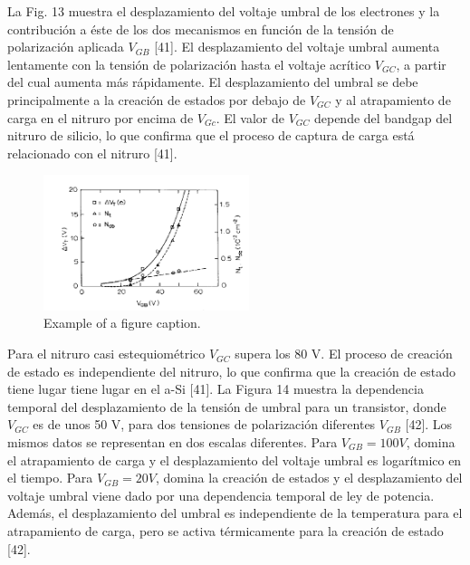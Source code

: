 \documentclass[conference]{IEEEtran}
\begin{document}
    La Fig. 13 muestra el desplazamiento del voltaje umbral de los electrones y la contribución a 
    éste de los dos mecanismos en función de la tensión de polarización aplicada $V_{GB}$ [41]. 
    El desplazamiento del voltaje umbral aumenta lentamente con la tensión de polarización hasta 
    el voltaje acrítico $V_{GC}$, a partir del cual aumenta más rápidamente. El desplazamiento del 
    umbral se debe principalmente a la creación de estados por debajo de $V_{GC}$ y al atrapamiento 
    de carga en el nitruro por encima de $V_{Gc}$. El valor de $V_{GC}$ depende del bandgap del 
    nitruro de silicio, lo que confirma que el proceso de captura de carga está relacionado con 
    el nitruro [41]. 

\begin{figure}[htbp]
    \centerline{\includegraphics[width=6.0cm]{img/imagen-13.png}}
    \caption{Example of a figure caption.}%
    \label{fig13}
\end{figure} 

    Para el nitruro casi estequiométrico $V_{GC}$ supera los 80 V. El proceso de creación de estado 
    es independiente del nitruro, lo que confirma que la creación de estado tiene lugar tiene lugar 
    en el a-Si [41]. La Figura 14 muestra la dependencia temporal del desplazamiento 
    de la tensión de umbral para un transistor, donde $V_{GC}$ es de unos 50 V, para dos tensiones 
    de polarización diferentes $V_{GB}$ [42]. Los mismos datos se representan en dos escalas 
    diferentes. Para $V_{GB} = 100 V$, domina el atrapamiento de carga y el desplazamiento del 
    voltaje umbral es logarítmico en el tiempo. Para $V_{GB} = 20 V$, domina la creación de estados 
    y el desplazamiento del voltaje umbral viene dado por una dependencia temporal de ley de potencia.
    Además, el desplazamiento del umbral es independiente de la temperatura para el atrapamiento de 
    carga, pero se activa térmicamente para la creación de estado [42].
    
\end{document}
